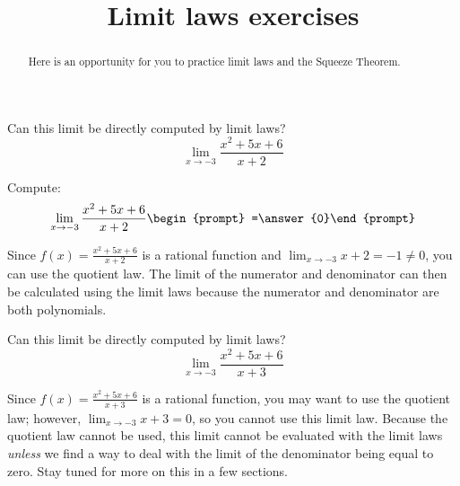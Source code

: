 \documentclass[handout]{ximera}
\title{Limit laws exercises}
\begin{document}
\begin{abstract}
Here is an opportunity for you to practice limit laws and the Squeeze Theorem.
\end{abstract}
\maketitle

\begin{exercise}
  Can this limit be directly computed by limit laws?
  \[
  \displaystyle\lim_{x\to -3}\frac{x^2+5x+6}{x+2} 
  \]
  \begin{multipleChoice}
  \end{multipleChoice}
  \begin{question}
    Compute:
    \[
    \displaystyle\lim_{x\to -3}\frac{x^2+5x+6}{x+2} \begin{prompt} =\answer{0}\end{prompt}
    \]
    \begin{feedback}
      Since $f(x)=\frac{x^2+5x+6}{x+2}$ is a rational function and
      $\displaystyle\lim_{x\to -3} x+2 =-1 \neq 0$, you can use the quotient law.  The limit of the numerator and denominator can then be calculated using the limit laws because the numerator and denominator are both polynomials. 
    \end{feedback}
  \end{question}
\end{exercise}

\begin{exercise}
  Can this limit be directly computed by limit laws?
  \[
  \displaystyle\lim_{x\to -3}\frac{x^2+5x+6}{x+3} 
  \]
  \begin{multipleChoice}
    
    \begin{feedback}[correct]
      Since $f(x)=\frac{x^2+5x+6}{x+3}$ is a rational function, you may want to use the quotient law; however, $\displaystyle\lim_{x\to -3} x+3 = 0$, so you cannot use this limit law.  Because the quotient law cannot be used, this limit cannot be evaluated with the limit laws \textit{unless} we find a way to deal with the limit of the denominator being equal to zero.  Stay tuned for more on this in a few sections.
    \end{feedback}
    
  \end{multipleChoice}

\end{exercise}
\end{document}
